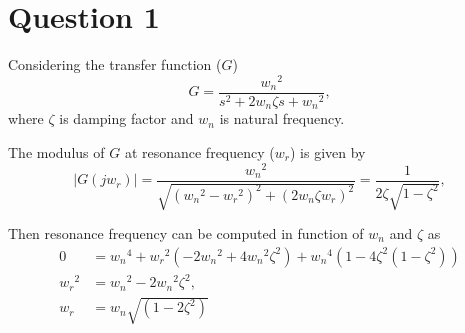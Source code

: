 \section{Question 1}
Considering the transfer function ($G$)
\begin{equation*}
G = \frac{{w_n}^2}{s^2 + 2 w_n \zeta s + {w_n}^2},
\end{equation*}
\noindent where $\zeta$ is damping factor and $w_n$ is natural frequency.

The modulus of $G$ at resonance frequency ($w_r$) is given by
\begin{equation*}
|G(j w_r)| = \frac{{w_n}^2}{\sqrt{{({w_n}^2-{w_r}^2)}^2 + (2 w_n \zeta w_r)^2}} = \frac{1}{2\zeta \sqrt{1 - \zeta^2}},
\end{equation*}

Then resonance frequency can be computed in function of $w_n$ and $\zeta$ as
\begin{align*}
0 &= {w_n}^4 + {w_r}^2 (-2 {w_n}^2 + 4 {w_n}^2\zeta^2) + {w_n}^4 (1 - 4\zeta^2(1 -\zeta^2)) 
\\
{w_r}^2 &= {w_n}^2 - 2 {w_n}^2 \zeta^2, 
\\
w_r& = w_n \sqrt{(1 - 2\zeta^2)}
\end{align*}






